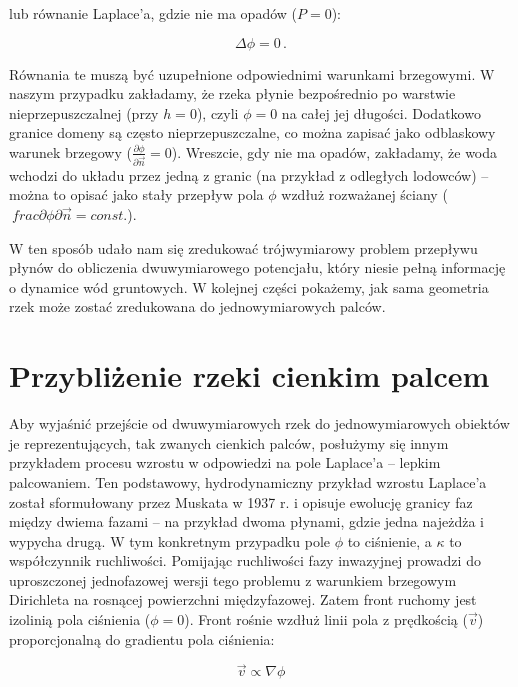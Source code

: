 \documentclass[]{pracamgr}
\begin{document}
      lub równanie Laplace'a, gdzie nie ma opadów ($P=0$):
      
      \begin{equation}
        \label{laplace}
    		\Delta \phi = 0 \,.
    	\end{equation}	

      Równania te muszą być uzupełnione odpowiednimi warunkami brzegowymi. W naszym przypadku zakładamy, że rzeka płynie bezpośrednio po warstwie nieprzepuszczalnej (przy $h = 0$), czyli $\phi = 0$ na całej jej długości. Dodatkowo granice domeny są często nieprzepuszczalne, co można zapisać jako odblaskowy warunek brzegowy ($\frac{\partial \phi} {\partial \vec{n}} = 0$). Wreszcie, gdy nie ma opadów, zakładamy, że woda wchodzi do układu przez jedną z granic (na przykład z odległych lodowców) -- można to opisać jako stały przepływ pola $\phi$ wzdłuż rozważanej ściany ($\ frac{\partial \phi} {\partial \vec{n}} = const.$).
      
      W ten sposób udało nam się zredukować trójwymiarowy problem przepływu płynów do obliczenia dwuwymiarowego potencjału, który niesie pełną informację o dynamice wód gruntowych. W kolejnej części pokażemy, jak sama geometria rzek może zostać zredukowana do jednowymiarowych palców.

    \section{Przybliżenie rzeki cienkim palcem}

      Aby wyjaśnić przejście od dwuwymiarowych rzek do jednowymiarowych obiektów je reprezentujących, tak zwanych cienkich palców, posłużymy się innym przykładem procesu wzrostu w odpowiedzi na pole Laplace'a -- lepkim palcowaniem. Ten podstawowy, hydrodynamiczny przykład wzrostu Laplace'a został sformułowany przez Muskata w 1937 r. \cite{muskat1937flow} i opisuje ewolucję granicy faz między dwiema fazami -- na przykład dwoma płynami, gdzie jedna najeżdża i wypycha drugą. W tym konkretnym przypadku pole $\phi$ to ciśnienie, a $\kappa$ to współczynnik ruchliwości. Pomijając ruchliwości fazy inwazyjnej prowadzi do uproszczonej jednofazowej wersji tego problemu z warunkiem brzegowym Dirichleta na rosnącej powierzchni międzyfazowej. Zatem front ruchomy jest izolinią pola ciśnienia ($\phi = 0$). Front rośnie wzdłuż linii pola z prędkością ($\vec{v}$) proporcjonalną do gradientu pola ciśnienia:
      
      \begin{equation}
        \vec{v} \propto \nabla \phi
      \end{equation}
\end{document}
